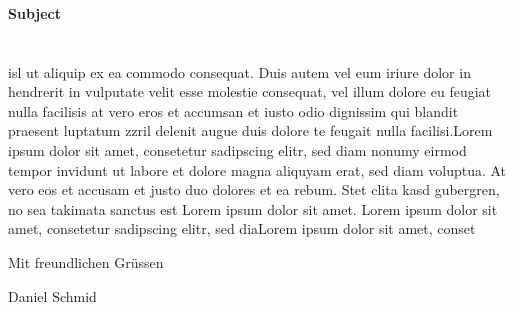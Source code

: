 \documentclass[a4paper,12pt]{letter}
\begin{document}
    \thispagestyle{fancy}
    \renewcommand{\headrulewidth}{0pt}
    \parbox[t][20mm]{89mm}{\fromName \\ \fromStreet \\ \fromPlace }
    \parbox[b][15mm]{90mm}{\fromDate}
    \\\par\vspace{10mm}\hspace{90mm}\parbox[b][15mm]{55mm} {\toAdress }

    \par
    \textbf{Subject} \\

    \salutContact \\\\
    isl ut aliquip ex ea commodo consequat. Duis autem vel eum iriure dolor in hendrerit in vulputate velit esse molestie consequat, vel illum dolore eu feugiat nulla facilisis at vero eros et accumsan et iusto odio dignissim qui blandit praesent luptatum zzril delenit augue duis dolore te feugait nulla facilisi.Lorem ipsum dolor sit amet, consetetur sadipscing elitr, sed diam nonumy eirmod tempor invidunt ut labore et dolore magna aliquyam erat, sed diam voluptua. At vero eos et accusam et justo duo dolores et ea rebum. Stet clita kasd gubergren, no sea takimata sanctus est Lorem ipsum dolor sit amet. Lorem ipsum dolor sit amet, consetetur sadipscing elitr, sed diaLorem ipsum dolor sit amet, conset
    \vspace{10mm}
    \par\hspace{90mm}Mit freundlichen Grüssen
    \par\vspace{15mm}\hspace{90mm}Daniel Schmid
\end{document}
